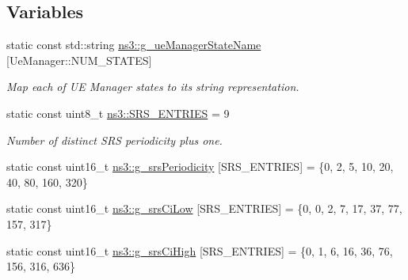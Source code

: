 \subsection*{Variables}
\begin{DoxyCompactItemize}
\item 
static const std\+::string \hyperlink{namespacens3_a970a8b48b37a47c9eb9d53d0ca669826}{ns3\+::g\+\_\+ue\+Manager\+State\+Name} \mbox{[}Ue\+Manager\+::\+N\+U\+M\+\_\+\+S\+T\+A\+T\+ES\mbox{]}
\begin{DoxyCompactList}\small\item\em Map each of UE Manager states to its string representation. \end{DoxyCompactList}\item 
static const uint8\+\_\+t \hyperlink{namespacens3_aaf5b96bcac774c553e55e91b666eea7e}{ns3\+::\+S\+R\+S\+\_\+\+E\+N\+T\+R\+I\+ES} = 9
\begin{DoxyCompactList}\small\item\em Number of distinct S\+RS periodicity plus one. \end{DoxyCompactList}\item 
static const uint16\+\_\+t \hyperlink{namespacens3_ab94f9219b63d35668c344ae7c4da9cb5}{ns3\+::g\+\_\+srs\+Periodicity} \mbox{[}S\+R\+S\+\_\+\+E\+N\+T\+R\+I\+ES\mbox{]} = \{0, 2, 5, 10, 20, 40, 80, 160, 320\}
\item 
static const uint16\+\_\+t \hyperlink{namespacens3_a97bc3bd90b7048826869728581199a13}{ns3\+::g\+\_\+srs\+Ci\+Low} \mbox{[}S\+R\+S\+\_\+\+E\+N\+T\+R\+I\+ES\mbox{]} = \{0, 0, 2, 7, 17, 37, 77, 157, 317\}
\item 
static const uint16\+\_\+t \hyperlink{namespacens3_a9be5b6d95f5014b227f14aa1205959be}{ns3\+::g\+\_\+srs\+Ci\+High} \mbox{[}S\+R\+S\+\_\+\+E\+N\+T\+R\+I\+ES\mbox{]} = \{0, 1, 6, 16, 36, 76, 156, 316, 636\}
\end{DoxyCompactItemize}
